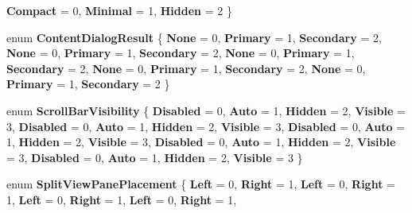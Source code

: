 \begin{DoxyCompactItemize}
{\bfseries Compact} = 0, 
{\bfseries Minimal} = 1, 
{\bfseries Hidden} = 2
 \}
\item 
\mbox{\label{namespace_windows_1_1_u_i_1_1_xaml_1_1_controls_aeb84959a5f71279742b9e779903775a6}} 
enum {\bfseries Content\+Dialog\+Result} \{ \newline
{\bfseries None} = 0, 
{\bfseries Primary} = 1, 
{\bfseries Secondary} = 2, 
{\bfseries None} = 0, 
\newline
{\bfseries Primary} = 1, 
{\bfseries Secondary} = 2, 
{\bfseries None} = 0, 
{\bfseries Primary} = 1, 
\newline
{\bfseries Secondary} = 2, 
{\bfseries None} = 0, 
{\bfseries Primary} = 1, 
{\bfseries Secondary} = 2, 
\newline
{\bfseries None} = 0, 
{\bfseries Primary} = 1, 
{\bfseries Secondary} = 2
 \}
\item 
\mbox{\label{namespace_windows_1_1_u_i_1_1_xaml_1_1_controls_a001a76f53e0cb6e7acfde3aeca1adf39}} 
enum {\bfseries Scroll\+Bar\+Visibility} \{ \newline
{\bfseries Disabled} = 0, 
{\bfseries Auto} = 1, 
{\bfseries Hidden} = 2, 
{\bfseries Visible} = 3, 
\newline
{\bfseries Disabled} = 0, 
{\bfseries Auto} = 1, 
{\bfseries Hidden} = 2, 
{\bfseries Visible} = 3, 
\newline
{\bfseries Disabled} = 0, 
{\bfseries Auto} = 1, 
{\bfseries Hidden} = 2, 
{\bfseries Visible} = 3, 
\newline
{\bfseries Disabled} = 0, 
{\bfseries Auto} = 1, 
{\bfseries Hidden} = 2, 
{\bfseries Visible} = 3, 
\newline
{\bfseries Disabled} = 0, 
{\bfseries Auto} = 1, 
{\bfseries Hidden} = 2, 
{\bfseries Visible} = 3
 \}
\item 
\mbox{\label{namespace_windows_1_1_u_i_1_1_xaml_1_1_controls_a9bf3cca91778a25f599f39263931d8f8}} 
enum {\bfseries Split\+View\+Pane\+Placement} \{ \newline
{\bfseries Left} = 0, 
{\bfseries Right} = 1, 
{\bfseries Left} = 0, 
{\bfseries Right} = 1, 
\newline
{\bfseries Left} = 0, 
{\bfseries Right} = 1, 
{\bfseries Left} = 0, 
{\bfseries Right} = 1, 
\newline

\end{DoxyCompactItemize}
